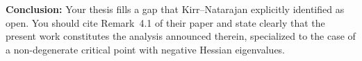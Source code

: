 \documentclass[11pt]{article}
\begin{document}
\textbf{Conclusion:} Your thesis fills a gap that Kirr--Natarajan explicitly identified as open. You should cite Remark~4.1 of their paper and state clearly that the present work constitutes the analysis announced therein, specialized to the case of a non-degenerate critical point with negative Hessian eigenvalues.
\end{document}
